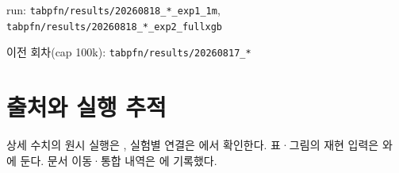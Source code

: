 \par\noindent \textbullet\enspace run: \texttt{tabpfn/\allowbreak{}\allowbreak{}r\allowbreak{}esults/\allowbreak{}\allowbreak{}2\allowbreak{}0260818\_\allowbreak{}\allowbreak{}*\_\allowbreak{}\allowbreak{}exp1\_\allowbreak{}\allowbreak{}1\allowbreak{}m}, \texttt{tabpfn/\allowbreak{}\allowbreak{}r\allowbreak{}esults/\allowbreak{}\allowbreak{}2\allowbreak{}0260818\_\allowbreak{}\allowbreak{}*\_\allowbreak{}\allowbreak{}exp2\_\allowbreak{}\allowbreak{}f\allowbreak{}ullxgb}


\par\noindent \textbullet\enspace 이전 회차(cap 100k): \texttt{tabpfn/\allowbreak{}\allowbreak{}r\allowbreak{}esults/\allowbreak{}\allowbreak{}2\allowbreak{}0260817\_\allowbreak{}\allowbreak{}*}




\section*{출처와 실행 추적}

상세 수치의 원시 실행은 , 실험별 연결은 에서 확인한다. 표·그림의 재현 입력은 와 에 둔다. 문서 이동·통합 내역은 에 기록했다.


